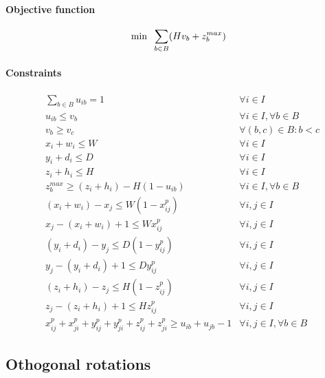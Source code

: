 \paragraph*{Objective function}
\begin{equation}
    \label{eq:objective}
    \min \hspace{.2cm} \sum\limits_{b \in B} (H v_b + z^{max}_b)
\end{equation}

\paragraph*{Constraints}
\begin{eqnarray}
    & \sum\limits_{b \in B}{u_{ib}} = 1 & \forall i \in I  \label{cons:all_items_in_bin} \\
    & u_{ib} \le v_b & \forall i \in I, \forall b \in B \label{cons:items_in_used_bins} \\
    & v_b \ge v_c & \forall (b,c) \in B : b < c  \label{cons:bin_breaking} \\
    & x_i + w_i \le W & \forall i \in I \label{cons:inside_x} \\ 
    & y_i + d_i \le D & \forall i \in I \label{cons:inside_y} \\ 
    & z_i + h_i \le H & \forall i \in I \label{cons:inside_z} \\ 
    & z^{max}_b \ge (z_i + h_i) - H(1-u_{ib}) & \forall i \in I, \forall b \in B \label{cons:maxz} \\
    & (x_i + w_i) - x_j\le W(1 - x^p_{ij}) & \forall i,j \in I \label{cons:x_prec_1} \\
    & x_j - (x_i + w_i) + 1 \le W x^p_{ij} & \forall i,j \in I \label{cons:x_prec_2} \\
    & (y_i + d_i) - y_j \le D(1 - y^p_{ij}) & \forall i,j \in I \label{cons:y_prec_1} \\
    & y_j - (y_i + d_i) + 1 \le D y^p_{ij} & \forall i,j \in I \label{cons:y_prec_2} \\
    & (z_i + h_i) - z_j\le H(1 - z^p_{ij}) & \forall i,j \in I \label{cons:z_prec_1} \\
    & z_j - (z_i + h_i) + 1 \le H z^p_{ij} & \forall i,j \in I \label{cons:z_prec_2} \\
    & x^p_{ij} + x^p_{ji} + y^p_{ij} + y^p_{ji} + z^p_{ij} + z^p_{ji} \ge u_{ib} + u_{jb} - 1 & \forall i,j \in I, \forall b \in B \label{cons:no_overlap}
\end{eqnarray}
\subsection*{Othogonal rotations}

